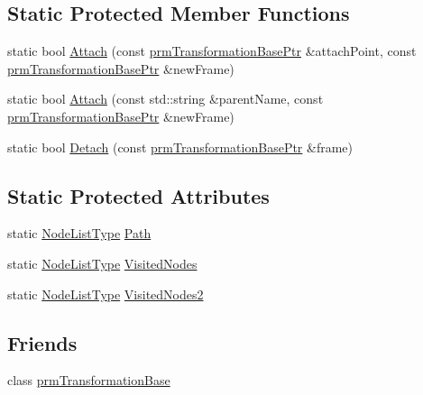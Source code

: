 \subsection*{Static Protected Member Functions}
\begin{DoxyCompactItemize}
\item 
static bool \hyperlink{classprm_transformation_manager_a5fbac7977cdd5b1ba5aa714bdd43ebce}{Attach} (const \hyperlink{prm_transformation_base_8h_a881a6a7d2191474974cdf36d79e1df08}{prm\-Transformation\-Base\-Ptr} \&attach\-Point, const \hyperlink{prm_transformation_base_8h_a881a6a7d2191474974cdf36d79e1df08}{prm\-Transformation\-Base\-Ptr} \&new\-Frame)
\item 
static bool \hyperlink{classprm_transformation_manager_a03378ef2a4bbc167c1f7d0d26e6bde96}{Attach} (const std\-::string \&parent\-Name, const \hyperlink{prm_transformation_base_8h_a881a6a7d2191474974cdf36d79e1df08}{prm\-Transformation\-Base\-Ptr} \&new\-Frame)
\item 
static bool \hyperlink{classprm_transformation_manager_a29d8204269b23e524976ead9b1111375}{Detach} (const \hyperlink{prm_transformation_base_8h_a881a6a7d2191474974cdf36d79e1df08}{prm\-Transformation\-Base\-Ptr} \&frame)
\end{DoxyCompactItemize}
\subsection*{Static Protected Attributes}
\begin{DoxyCompactItemize}
\item 
static \hyperlink{classprm_transformation_manager_a7aaa30d4612656c91c80fc8ee8b96518}{Node\-List\-Type} \hyperlink{classprm_transformation_manager_a5ca4de06a3cb7a5997b754f6f96da737}{Path}
\item 
static \hyperlink{classprm_transformation_manager_a7aaa30d4612656c91c80fc8ee8b96518}{Node\-List\-Type} \hyperlink{classprm_transformation_manager_a5e3fe611cb19ecfdfa5edaea3a7920b0}{Visited\-Nodes}
\item 
static \hyperlink{classprm_transformation_manager_a7aaa30d4612656c91c80fc8ee8b96518}{Node\-List\-Type} \hyperlink{classprm_transformation_manager_a667e73caad0b315c6b0bde485f5fd168}{Visited\-Nodes2}
\end{DoxyCompactItemize}
\subsection*{Friends}
\begin{DoxyCompactItemize}
\item 
class \hyperlink{classprm_transformation_manager_a1414bde07bd6dda93937227241d8b7ee}{prm\-Transformation\-Base}
\end{DoxyCompactItemize}


